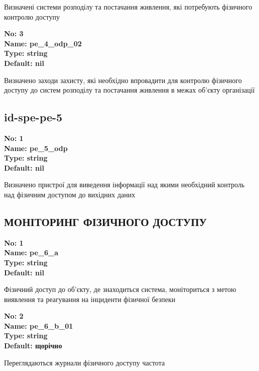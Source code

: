 \documentclass{article}
\begin{document}
{\footnotesize Визначені системи розподілу та постачання живлення, які потребують фізичного контролю доступу}


{\footnotesize\bfseries
No: 3\\
Name: pe\_\allowbreak{}4\_\allowbreak{}odp\_\allowbreak{}02\\
Type: string\\
Default: nil
}

{\footnotesize Визначено заходи захисту, які необхідно впровадити для контролю фізичного доступу до систем розподілу та постачання живлення в межах об'єкту організації}




\subsection{id-spe-pe-5}


\vspace{10pt}
{\footnotesize\bfseries
No: 1\\
Name: pe\_\allowbreak{}5\_\allowbreak{}odp\\
Type: string\\
Default: nil
}

{\footnotesize Визначено пристрої для виведення інформації над якими необхідний контроль над фізичним доступом до вихідних даних}




\subsection{МОНІТОРИНГ ФІЗИЧНОГО ДОСТУПУ}


\vspace{10pt}
{\footnotesize\bfseries
No: 1\\
Name: pe\_\allowbreak{}6\_\allowbreak{}a\\
Type: string\\
Default: nil
}

{\footnotesize Фізичний доступ до об'єкту, де знаходиться система, моніториться з метою виявлення та реагування на інциденти фізичної безпеки}


{\footnotesize\bfseries
No: 2\\
Name: pe\_\allowbreak{}6\_\allowbreak{}b\_\allowbreak{}01\\
Type: string\\
Default: \textquotedbl{}щорічно\textquotedbl{}
}

{\footnotesize Переглядаються журнали фізичного доступу частота}
\end{document}
